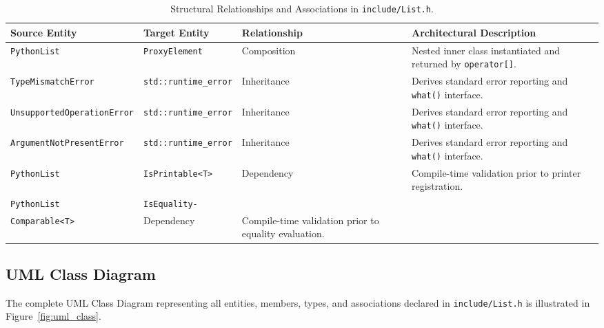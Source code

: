 \documentclass[12pt,a4paper]{report}
\begin{document}
\begin{table}[htbp]
\centering
\small
\begin{tabularx}{\linewidth}{@{} >{\raggedright\arraybackslash}p{3.5cm} >{\raggedright\arraybackslash}p{2.6cm} >{\raggedright\arraybackslash}p{2.2cm} X@{}}
\toprule
\textbf{Source Entity} & \textbf{Target Entity} & \textbf{Relationship} & \textbf{Architectural Description} \\
\midrule
\texttt{PythonList} & \texttt{ProxyElement} & Composition & Nested inner class instantiated and returned by \texttt{operator[]}. \\
\texttt{TypeMismatchError} & \texttt{std::run\-time\_\allowbreak error} & Inheritance & Derives standard error reporting and \texttt{what()} interface. \\
\texttt{Un\-sup\-port\-ed\-Op\-er\-a\-tion\-Er\-ror} & \texttt{std::run\-time\_\allowbreak error} & Inheritance & Derives standard error reporting and \texttt{what()} interface. \\
\texttt{Ar\-gu\-ment\-Not\-Pre\-sent\-Er\-ror} & \texttt{std::run\-time\_\allowbreak error} & Inheritance & Derives standard error reporting and \texttt{what()} interface. \\
\texttt{PythonList} & \texttt{IsPrintable<T>} & Dependency & Compile-time validation prior to printer registration. \\
\texttt{PythonList} & \texttt{IsEquality-}\\\texttt{Comparable<T>} & Dependency & Compile-time validation prior to equality evaluation. \\
\bottomrule
\end{tabularx}
\caption{Structural Relationships and Associations in \texttt{include/List.h}.}
\label{tab:associations}
\end{table}

\newpage
\subsection{UML Class Diagram}

The complete UML Class Diagram representing all entities, members, types, and associations declared in \texttt{include/List.h} is illustrated in Figure~\ref{fig:uml_class}.
\end{document}
